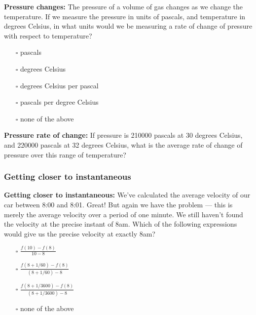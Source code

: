\documentclass[pdftex, brazil, 12pt, twoside]{article}
\begin{document}
\begin{exercise}
  \textbf{Pressure changes:} The pressure of a volume of gas changes as we change
  the temperature. If we measure the pressure in units of pascals, and temperature
  in degrees Celsius, in what units would we be measuring a rate of change of
  pressure with respect to temperature?
\begin{itemize}[noitemsep]
\item[$\square$] pascals
\item[$\square$] degrees Celsius
\item[$\square$] degrees Celsius per pascal
\item[$\square$] pascals per degree Celsius
\item[$\square$] none of the above
\end{itemize}
\end{exercise}

\begin{exercise}
  \textbf{Pressure rate of change:} If pressure is 210000 pascals at 30 degrees
  Celsius, and 220000 pascals at 32 degrees Celsius, what is the average rate
  of change of pressure over this range of temperature?
\end{exercise}

\subsubsection{Getting closer to instantaneous}
\label{u1-what-getting-closer}

\begin{exercise}
  \textbf{Getting closer to instantaneous:}  We've calculated the average velocity
  of our car between 8:00 and 8:01. Great! But again we have the problem --- this
  is merely the average velocity over a period of one minute. We still haven't
  found the velocity at the precise instant of 8am. Which of the following expressions
  would give us the precise velocity at exactly 8am? 
\begin{itemize}
\item[$\square$] $\displaystyle \frac{f(10)-f(8)}{10-8}$
\item[$\square$] $\displaystyle \frac{f(8+1/60)-f(8)}{(8+1/60)-8}$
\item[$\square$] $\displaystyle \frac{f(8+1/3600)-f(8)}{(8+1/3600)-8}$
\item[$\square$] none of the above
\end{itemize}
\end{exercise}
\end{document}
